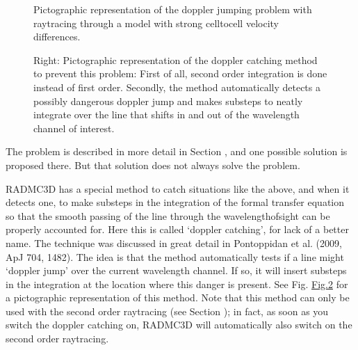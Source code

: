 \documentclass[letterpaper,10pt,english]{sphinxmanual}
\begin{document}
\begin{figure}[htbp]
\centering
\capstart

\noindent{}
\caption{Pictographic representation of the doppler jumping problem with
ray\sphinxhyphen{}tracing through a model with strong cell\sphinxhyphen{}to\sphinxhyphen{}cell velocity differences.}\label{\detokenize{lineradtrans:id1}}\label{\detokenize{lineradtrans:fig-doppler-jump}}\end{figure}

\begin{figure}[htbp]
\centering
\capstart

\noindent{}
\caption{Right: Pictographic representation of the doppler catching method to
prevent this problem: First of all, second order integration is done
instead of first order. Secondly, the method automatically detects a
possibly dangerous doppler jump and makes sub\sphinxhyphen{}steps to neatly integrate
over the line that shifts in\sphinxhyphen{} and out of the wavelength channel of
interest.}\label{\detokenize{lineradtrans:id2}}\label{\detokenize{lineradtrans:fig-doppler-catch}}\end{figure}

The problem is described in more detail in Section {\hyperref[\detokenize{imagesspectra:sec-wavelength-bands}]{}},
and one possible solution is proposed there.  But that solution does not always
solve the problem.

RADMC\sphinxhyphen{}3D has a special method to catch situations like the above, and when
it detects one, to make sub\sphinxhyphen{}steps in the integration of the formal transfer
equation so that the smooth passing of the line through the
wavelength\sphinxhyphen{}of\sphinxhyphen{}sight can be properly accounted for. Here this is called
‘doppler catching’, for lack of a better name. The technique was discussed
in great detail in Pontoppidan et al. (2009, ApJ 704, 1482). The idea is
that the method automatically tests if a line might ‘doppler jump’ over
the current wavelength channel. If so, it will insert substeps in the
integration at the location where this danger is present. See
Fig. \hyperref[\detokenize{lineradtrans:fig-doppler-catch}]{Fig.\@ \ref{\detokenize{lineradtrans:fig-doppler-catch}}} for a pictographic representation of this
method. Note that this method can only be used with the second order
ray\sphinxhyphen{}tracing (see Section {\hyperref[\detokenize{imagesspectra:sec-second-order}]{}}); in fact, as soon as you
switch the doppler catching on, RADMC\sphinxhyphen{}3D will automatically also switch on
the second order ray\sphinxhyphen{}tracing.
\end{document}
